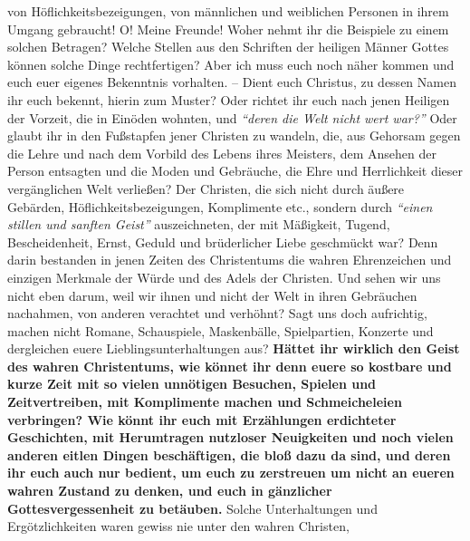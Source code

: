 von Höflichkeitsbezeigungen, von männlichen und weiblichen Personen in ihrem
Umgang gebraucht! O! Meine Freunde! Woher nehmt ihr die Beispiele zu einem
solchen Betragen? Welche Stellen aus den Schriften der heiligen Männer Gottes
können solche Dinge rechtfertigen? Aber ich muss euch noch näher kommen und
euch euer eigenes Bekenntnis vorhalten. -- Dient euch Christus, zu dessen Namen ihr
euch bekennt, hierin zum Muster? Oder richtet ihr euch
nach jenen Heiligen der Vorzeit, die in Einöden wohnten, und
\textit{"`deren die Welt nicht wert war?"'}
Oder glaubt ihr in den Fußstapfen jener Christen zu
wandeln, die, aus Gehorsam gegen die Lehre und nach dem Vorbild des Lebens
ihres Meisters, dem Ansehen der Person entsagten und die Moden und Gebräuche,
die Ehre und Herrlichkeit dieser vergänglichen Welt verließen? Der Christen, die
sich nicht durch äußere Gebärden, Höflichkeitsbezeigungen, Komplimente etc.,
sondern durch
\textit{"`einen stillen und sanften Geist"'}
auszeichneten, der mit Mäßigkeit, Tugend,
Bescheidenheit, Ernst, Geduld und
brüderlicher Liebe geschmückt war? Denn darin bestanden in jenen Zeiten des
Christentums die wahren Ehrenzeichen und einzigen Merkmale der Würde und des
Adels der Christen. Und sehen wir uns nicht eben darum, weil wir ihnen und nicht
der Welt in ihren Gebräuchen nachahmen, von anderen verachtet und verhöhnt? Sagt
uns doch aufrichtig, machen nicht Romane,
Schauspiele, Maskenbälle,
Spielpartien, Konzerte und dergleichen euere
Lieblingsunterhaltungen aus? \label{ref:10_08_zeitvertreib} \textbf{Hättet ihr
wirklich den Geist des wahren Christentums, wie
könnet ihr denn euere so
kostbare und kurze Zeit mit so vielen unnötigen Besuchen,
Spielen und
Zeitvertreiben, mit Komplimente machen und Schmeicheleien
verbringen? Wie könnt ihr euch mit Erzählungen erdichteter
Geschichten, mit Herumtragen
nutzloser Neuigkeiten und noch vielen anderen
eitlen Dingen beschäftigen, die bloß dazu da sind, und deren ihr euch auch 
nur bedient, um euch zu zerstreuen um nicht an eueren 
wahren Zustand zu denken, und euch in gänzlicher
Gottesvergessenheit zu
betäuben.} Solche Unterhaltungen und Ergötzlichkeiten
waren gewiss nie unter den wahren Christen,
